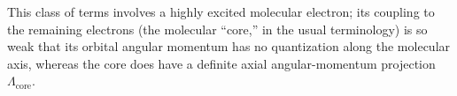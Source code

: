 This class of terms involves a highly excited molecular electron; its coupling to the remaining electrons (the molecular ``core,'' in the usual terminology) is so weak that its orbital angular momentum has no quantization along the molecular axis, whereas the core does have a definite axial angular-momentum projection $\Lambda_{\text{core}}$.
